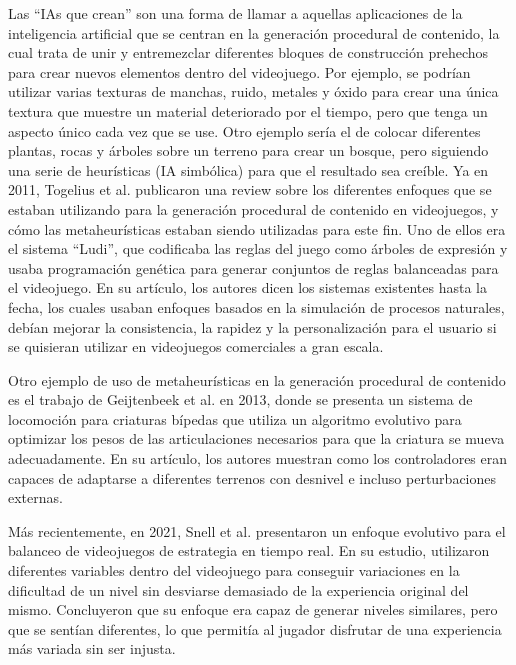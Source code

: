 Las ``IAs que crean'' son una forma de llamar a aquellas aplicaciones de la inteligencia artificial que se centran en la generación procedural de contenido, la cual trata de unir y entremezclar diferentes bloques de construcción prehechos para crear nuevos elementos dentro del videojuego. Por ejemplo, se podrían utilizar varias texturas de manchas, ruido, metales y óxido para crear una única textura que muestre un material deteriorado por el tiempo, pero que tenga un aspecto único cada vez que se use. Otro ejemplo sería el de colocar diferentes plantas, rocas y árboles sobre un terreno para crear un bosque, pero siguiendo una serie de heurísticas (IA simbólica) para que el resultado sea creíble. Ya en 2011, Togelius et al. \cite{togelius_search-based_2011} publicaron una review sobre los diferentes enfoques que se estaban utilizando para la generación procedural de contenido en videojuegos, y cómo las metaheurísticas estaban siendo utilizadas para este fin. Uno de ellos era el sistema ``Ludi'', que codificaba las reglas del juego como árboles de expresión y usaba programación genética para generar conjuntos de reglas balanceadas para el videojuego. En su artículo, los autores dicen los sistemas existentes hasta la fecha, los cuales usaban enfoques basados en la simulación de procesos naturales, debían mejorar la consistencia, la rapidez y la personalización para el usuario si se quisieran utilizar en videojuegos comerciales a gran escala. 

Otro ejemplo de uso de metaheurísticas en la generación procedural de contenido es el trabajo de Geijtenbeek et al. \cite{geijtenbeek_flexible_2013} en 2013, donde se presenta un sistema de locomoción para criaturas bípedas que utiliza un algoritmo evolutivo para optimizar los pesos de las articulaciones necesarios para que la criatura se mueva adecuadamente. En su artículo, los autores muestran como los controladores eran capaces de adaptarse a diferentes terrenos con desnivel e incluso perturbaciones externas.

Más recientemente, en 2021, Snell et al. \cite{snell_evolutionary_2021} presentaron un enfoque evolutivo para el balanceo de videojuegos de estrategia en tiempo real. En su estudio, utilizaron diferentes variables dentro del videojuego para conseguir variaciones en la dificultad de un nivel sin desviarse demasiado de la experiencia original del mismo. Concluyeron que su enfoque era capaz de generar niveles similares, pero que se sentían diferentes, lo que permitía al jugador disfrutar de una experiencia más variada sin ser injusta.

